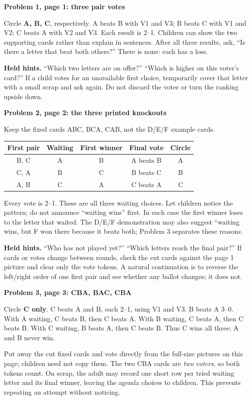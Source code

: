 \documentclass[11pt]{article}
\newcommand{\sub}[1]{\par\textbf{#1}\par}
\begin{document}
\sub{Problem 1, page 1: three pair votes}
Circle \textbf{A, B, C}, respectively. A beats B with V1 and V3; B beats C with V1 and V2; C beats A with V2 and V3. Each result is 2--1. Children can show the two supporting cards rather than explain in sentences. After all three results, ask, ``Is there a letter that beat both others?'' There is none: each has a loss.

\textbf{Held hints.} ``Which two letters are on offer?'' ``Which is higher on this voter's card?'' If a child votes for an unavailable first choice, temporarily cover that letter with a small scrap and ask again. Do not discard the voter or turn the ranking upside down.

\sub{Problem 2, page 2: the three printed knockouts}
Keep the fixed cards ABC, BCA, CAB, not the D/E/F example cards.
\begin{center}\renewcommand{\arraystretch}{1.18}
\begin{tabular}{ccccc}
First pair & Waiting & First winner & Final vote & Circle\\\midrule
B, C & A & B & A beats B & A\\
C, A & B & C & B beats C & B\\
A, B & C & A & C beats A & C
\end{tabular}\end{center}
Every vote is 2--1. These are all three waiting choices. Let children notice the pattern; do not announce ``waiting wins'' first. In each case the first winner loses to the letter that waited. The D/E/F demonstration may also suggest ``waiting wins, but F won there because it beats both; Problem 3 separates these reasons.

\textbf{Held hints.} ``Who has not played yet?'' ``Which letters reach the final pair?'' If cards or votes change between rounds, check the cut cards against the page 1 picture and clear only the vote tokens. A natural continuation is to reverse the left/right order of one first pair and see whether any ballot changes; it does not.

\sub{Problem 3, page 3: CBA, BAC, CBA}
Circle \textbf{C only}. C beats A and B, each 2--1, using V1 and V3. B beats A 3--0. With A waiting, C beats B, then C beats A. With B waiting, C beats A, then C beats B. With C waiting, B beats A, then C beats B. Thus C wins all three; A and B never win.

Put away the cut fixed cards and vote directly from the full-size pictures on this page; children need not copy them. The two CBA cards are \emph{two voters}, so both tokens count. On scrap, the adult may record one short row per tried waiting letter and its final winner, leaving the agenda choices to children. This prevents repeating an attempt without noticing.
\end{document}

